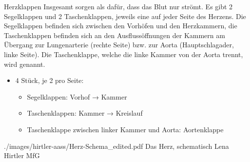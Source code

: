\TextSlidePicture
{Herzklappen}%
{%
%
%
%
%
Insgesamt   sorgen als 
dafür, dass das Blut nur  strömt. Es
gibt 2 Segelklappen und 2 Taschenklappen, jeweils eine auf
jeder Seite des Herzens. 
%
Die Segelklappen befinden sich
zwischen den Vorhöfen und den Herzkammern, die
Taschenklappen befinden sich an den Ausflussöffnungen der
Kammern am Übergang zur Lungenarterie (rechte Seite) bzw.
zur  Aorta (Hauptschlagader, linke Seite). %
%
Die Taschenklappe, 
welche die linke Kammer von der Aorta trennt, 
wird  genannt.
\hfill{}%
}%
{
\begin{itemize}
  \item 4 Stück, je 2 pro Seite:
  \begin{itemize}
    \item Segelklappen: Vorhof → Kammer
    \item Taschenklappen: Kammer → Kreislauf
    \item Taschenklappe zwischen linker Kammer und Aorta: Aortenklappe
  \end{itemize}
\end{itemize}}%
{./images/hirtler-aass/Herz-Schema_edited.pdf}%
{Das Herz, schematisch}%
{}%
{Lena Hirtler}%
{MfG}%




%
%

